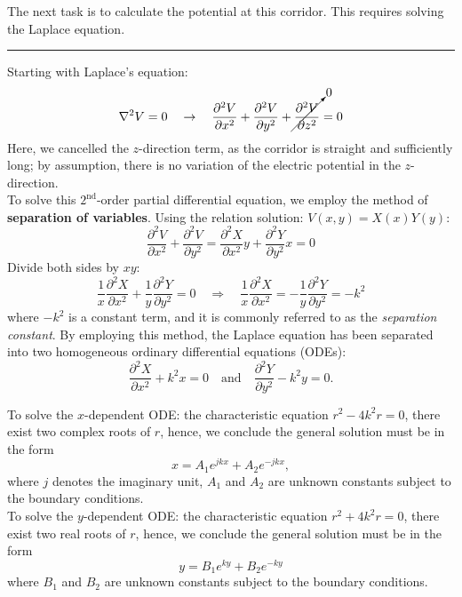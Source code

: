 \documentclass[a4paper, 12pt]{article}
\begin{document}
\begin{mdframed}
The next task is to calculate the potential at this corridor. This requires solving the Laplace equation.

\vspace{.3cm}  \hrule \vspace{.3cm}

Starting with Laplace's equation:
\[
    \nabla^{2}V = 0 
    \quad \to \quad 
    \frac{\partial^{2} V}{\partial x^{2}} + \frac{\partial^{2} V}{\partial y^{2}} + \cancelto{0}{\frac{\partial^{2} V}{\partial z^{2}}} = 0
\]
Here, we cancelled the $z$-direction term, as the corridor is straight and sufficiently long; by assumption, there is no variation of the electric potential in the $z$-direction. \\

To solve this $2^{\text{nd}}$-order partial differential equation, we employ the method of \textbf{separation of variables}. Using the relation solution: $V(x, y) = X(x) Y(y)$:
\[
    \frac{\partial^{2} V}{\partial x^{2}} + \frac{\partial^{2} V}{\partial y^{2}} 
    = 
    \frac{\partial^{2} X}{\partial x^{2}}y + \frac{\partial^{2} Y}{\partial y^{2}}x 
    = 0
\]
Divide both sides by $xy$:
\[
    \frac{1}{x} \frac{\partial^{2} X}{\partial x^{2}} + \frac{1}{y} \frac{\partial^{2} Y}{\partial y^{2}} = 0 
    \quad \Rightarrow \quad
    \frac{1}{x} \frac{\partial^{2} X}{\partial x^{2}} = -\frac{1}{y} \frac{\partial^{2} Y}{\partial y^{2}} = -k^{2}
\]
where $-k^2$ is a constant term, and it is commonly referred to as the \textit{separation constant}. By employing this method, the Laplace equation has been separated into two homogeneous ordinary differential equations (ODEs):
\[ 
    \frac{\partial^{2} X}{\partial x^{2}} + k^{2}x = 0 
    \quad \text{and} \quad 
    \frac{\partial^{2} Y}{\partial y^{2}} - k^{2}y = 0.
\]

To solve the $x$-dependent ODE: the characteristic equation $r^2-4k^2r = 0$, there exist two complex roots of $r$, hence, we conclude the general solution must be in the form 
\[
    x = A_{1}e^{jkx}+ A_{2}e^{-jkx},
\]
where $j$ denotes the imaginary unit, $A_1$ and $A_2$ are unknown constants subject to the boundary conditions. \\

To solve the $y$-dependent ODE: the characteristic equation $r^2+4k^2r = 0$, there exist two real roots of $r$, hence, we conclude the general solution must be in the form 
\[
    y = B_{1}e^{ky}+B_{2}e^{-ky}
\]
where $B_1$ and $B_2$ are unknown constants subject to the boundary conditions. \\


\end{mdframed}
\end{document}
